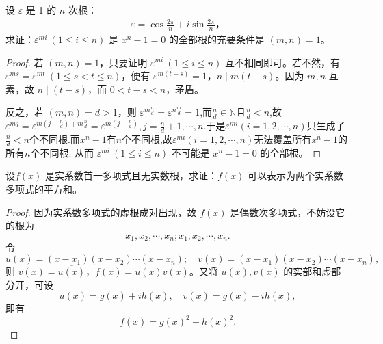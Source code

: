 \documentclass[../../main.tex]{subfiles}%
\begin{document}
\begin{example}
设 $\varepsilon$ 是 1 的 $n$ 次根：
\begin{align*}
\varepsilon = \cos \frac{2\pi}{n} + i \sin \frac{2\pi}{n}，
\end{align*}
求证：$\varepsilon^{mi} \ (1 \leqslant  i \leqslant  n)$ 是 $x^n - 1 = 0$ 的全部根的充要条件是 $(m, n) = 1$。
\end{example}
\begin{proof}

若 $(m, n) = 1$，只要证明 $\varepsilon^{mi} \ (1 \leqslant  i \leqslant  n)$ 互不相同即可。若不然，有 $\varepsilon^{ms} = \varepsilon^{mt} \ (1 \leqslant  s < t \leqslant  n)$，便有 $\varepsilon^{m(t-s)} = 1$，$n \mid m(t-s)$。因为 $m, n$ 互素，故 $n \mid (t-s)$，而 $0 < t-s < n$，矛盾。

反之，若 $(m, n) = d > 1$，则 $\varepsilon^{m \frac{n}{d}} = \varepsilon^{n \frac{m}{d}} = 1$,而$\frac{n}{d}\in \mathbb{N}$且$\frac{n}{d}<n$,故$\varepsilon ^{mj}=\varepsilon ^{m\left( j-\frac{n}{d} \right) +m\frac{n}{d}}=\varepsilon ^{m\left( j-\frac{n}{d} \right)},j=\frac{n}{d}+1,\cdots ,n.$于是$\varepsilon ^{mi}\left( i=1,2,\cdots ,n \right) $只生成了$\frac{n}{d}<n$个不同根.而$x^n-1$有$n$个不同根,故$\varepsilon ^{mi}\left( i=1,2,\cdots ,n \right)$无法覆盖所有$x^n-1$的所有$n$个不同根.
从而 $\varepsilon^{mi} \ (1 \leqslant  i \leqslant  n)$ 不可能是 $x^n - 1 = 0$ 的全部根。

\end{proof}

\begin{proposition}
设\( f(x) \) 是实系数首一多项式且无实数根，求证：\( f(x) \) 可以表示为两个实系数多项式的平方和。
\end{proposition}
\begin{proof}

因为实系数多项式的虚根成对出现，故 \( f(x) \) 是偶数次多项式，不妨设它的根为
\[
x_1, x_2, \cdots, x_n; \overline{x_1}, \overline{x_2}, \cdots, \overline{x_n}.
\]
令
\[
u(x) = (x - x_1)(x - x_2) \cdots (x - x_n); \quad v(x) = (x - \overline{x_1})(x - \overline{x_2}) \cdots (x - \overline{x_n}),
\]
则 \( v(x) = \overline{u(x)} \)，\( f(x) = u(x)v(x) \)。又将 \( u(x), v(x) \) 的实部和虚部分开，可设
\[
u(x) = g(x) + ih(x), \quad v(x) = g(x) - ih(x),
\]
即有
\[
f(x) = g(x)^2 + h(x)^2.
\]

\end{proof}
\end{document}
